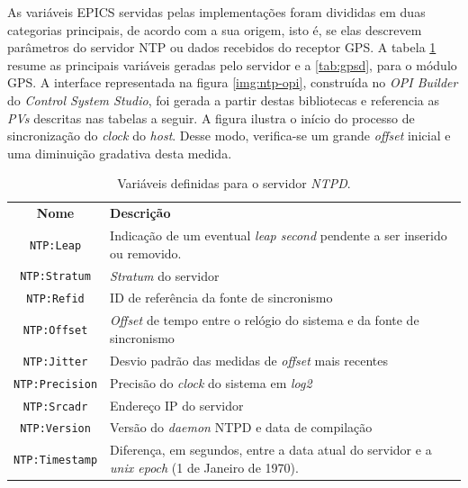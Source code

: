 \vspace{12pt}

As variáveis EPICS servidas pelas implementações foram divididas em duas
categorias principais, de acordo com a sua origem, isto é, se elas
descrevem parâmetros do servidor NTP ou dados recebidos do receptor GPS. A
tabela \ref{tab:ntpd} resume as principais variáveis geradas pelo servidor e a
\ref{tab:gpsd}, para o módulo GPS. A interface representada na figura
\ref{img:ntp-opi}, construída no \textit{OPI Builder} do \textit{Control System
Studio}, foi gerada a partir destas bibliotecas e referencia as \textit{PVs}
descritas nas tabelas a seguir. A figura ilustra o início do processo de
sincronização do \textit{clock} do \textit{host}. Desse modo, verifica-se um
grande \textit{offset} inicial e uma diminuição gradativa desta medida.

\begin{table}[h]

	\centering
	\caption{\label{tab:ntpd} Variáveis definidas para o servidor
	\textit{NTPD}.}
	\begin{tabular}{| c | p{} |}
		\hline
		\textbf{Nome} & \textbf{Descrição} \\	\hhline{|=|=|}
		\texttt{NTP:Leap} & Indicação de um eventual \textit{leap second} pendente a
		ser inserido ou removido. \\
		\hline \texttt{NTP:Stratum} & \textit{Stratum} do servidor \\ \hline
		\texttt{NTP:Refid} & ID de referência da fonte de sincronismo \\ \hline
		\texttt{NTP:Offset} & \textit{Offset} de tempo entre o relógio do sistema e da
		fonte de sincronismo \\
		\hline \texttt{NTP:Jitter} & Desvio padrão das medidas de \textit{offset} mais
		recentes \\ \hline 
		\texttt{NTP:Precision} & Precisão do \textit{clock} do sistema em
		\textit{log2} \\
		\hline \texttt{NTP:Srcadr} & Endereço IP do servidor \\ \hline 			
		\texttt{NTP:Version} & Versão do \textit{daemon} NTPD e data de compilação \\
		\hline \texttt{NTP:Timestamp} & Diferença, em segundos, entre a data atual do
		servidor e a \textit{unix epoch} (1 de Janeiro de 1970). \\ \hline
	\end{tabular}	    
\end{table}

